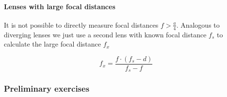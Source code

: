 \documentclass{scrreprt}
\begin{document}
\paragraph{Lenses with large focal distances}
It is not possible to directly measure focal distances $f > \frac{a}{4}$. Analogous to diverging lenses we just use a second lens with known focal distance $f_s$ to calculate the large focal distance $f_x$

\begin{equation}
f_x = \frac{f \cdot \left( f_s - d\right)}{f_s - f}
\end{equation}

\subsubsection{Preliminary exercises}
\end{document}
